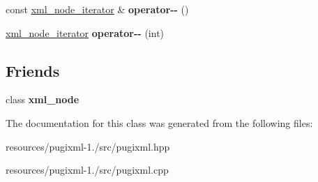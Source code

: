 \begin{DoxyCompactItemize}
\item 
\hypertarget{classpugi_1_1xml__node__iterator_a83ff5311f3d71c127e89a5cf6bf9d361}{const \hyperlink{classpugi_1_1xml__node__iterator}{xml\+\_\+node\+\_\+iterator} \& {\bfseries operator-\/-\/} ()}\label{classpugi_1_1xml__node__iterator_a83ff5311f3d71c127e89a5cf6bf9d361}

\item 
\hypertarget{classpugi_1_1xml__node__iterator_a85c3618b5bb64a3e8695335e80475804}{\hyperlink{classpugi_1_1xml__node__iterator}{xml\+\_\+node\+\_\+iterator} {\bfseries operator-\/-\/} (int)}\label{classpugi_1_1xml__node__iterator_a85c3618b5bb64a3e8695335e80475804}

\end{DoxyCompactItemize}
\subsection*{Friends}
\begin{DoxyCompactItemize}
\item 
\hypertarget{classpugi_1_1xml__node__iterator_a156d917a92815c7b593bd5ef19f6d5fb}{class {\bfseries xml\+\_\+node}}\label{classpugi_1_1xml__node__iterator_a156d917a92815c7b593bd5ef19f6d5fb}

\end{DoxyCompactItemize}


The documentation for this class was generated from the following files\+:\begin{DoxyCompactItemize}
\item 
resources/pugixml-\/1./src/pugixml.\+hpp\item 
resources/pugixml-\/1./src/pugixml.\+cpp\end{DoxyCompactItemize}
